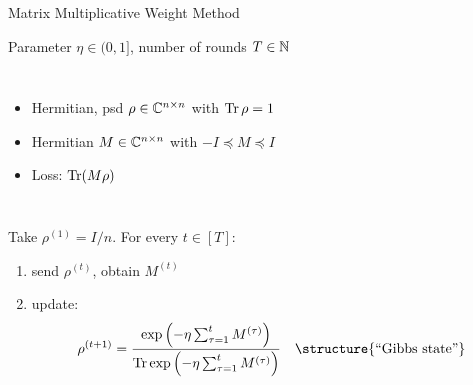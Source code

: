 \begin{frame}{Matrix Multiplicative Weight Method}

 Parameter $\eta \in (0,1]$, number of rounds $T\in\mathbb{N}$

\vspace{\floatsep}

\begin{columns}

\begin{itemize}
 \item Hermitian, psd $\rho\in\mathbb{C}^{n\times n}$ with $\operatorname{Tr}\rho=1$
 \item Hermitian $M\in\mathbb{C}^{n\times n}$ with $-I \preceq M \preceq I$
 \item Loss: $\operatorname{Tr}(M\rho)$
\end{itemize}

\end{columns}

\vspace{3\floatsep}

\pause

 Take $\rho^{(1)} = I/n$. For every $t\in [T]$: 
\begin{enumerate}
 \item send $\rho^{(t)}$, obtain $M^{(t)}$
 \item update:
 \begin{equation*}
  \rho^{(t+1)} = \frac{\exp\left(-\eta \sum_{\tau=1}^t M^{(\tau)}\right) }{\Tr \exp\left(-\eta \sum_{\tau=1}^t M^{(\tau)}\right)} \quad \text{\structure{``Gibbs state''}}
 \end{equation*}

\end{enumerate}
 
\end{frame}


